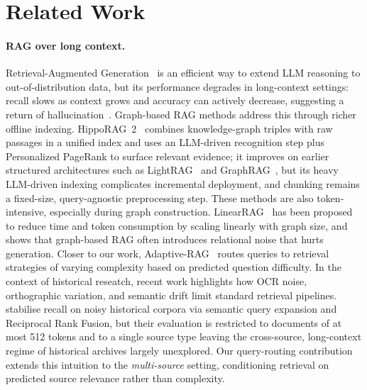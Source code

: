 
\section{Related Work}
\label{sec:related-work}

\paragraph{RAG over long context.}
Retrieval-Augmented Generation~\cite{rag_2020} is an efficient way to extend
LLM reasoning to out-of-distribution data, but its performance degrades in
long-context settings: recall slows as context grows and accuracy can
actively decrease, suggesting a return of hallucination~\cite{leng_long_2024}. Graph-based RAG methods address this through richer offline indexing.
HippoRAG~2~\cite{hipporagv2} combines knowledge-graph triples with raw passages in a unified index and uses an LLM-driven recognition step plus Personalized PageRank to surface
relevant evidence; it improves on earlier structured architectures such as
LightRAG~\cite{lightrag} and GraphRAG~\cite{graphrag_2024}, but its heavy
LLM-driven indexing complicates incremental deployment, and chunking remains
a fixed-size, query-agnostic preprocessing step. These methods are also token-intensive, especially during graph construction. LinearRAG~\cite{linearrag_2025} has been proposed to reduce time and token consumption by scaling linearly with graph size, and shows that graph-based RAG often introduces relational noise that hurts generation. Closer to our work, Adaptive-RAG~\cite{adaptive_rag_2024} routes
queries to retrieval strategies of varying complexity based on predicted
question difficulty.
In the context of historical reseatch, recent work highlights how OCR noise, orthographic
variation, and semantic drift limit standard retrieval pipelines.
\citet{Mudet_Bakkali_2025} stabilise recall on noisy historical corpora via
semantic query expansion and Reciprocal Rank Fusion, but their evaluation
is restricted to documents of at most 512 tokens and to a single source
type leaving the cross-source, long-context regime of historical
archives largely unexplored.
Our query-routing contribution extends this intuition to the
\emph{multi-source} setting, conditioning retrieval on predicted source
relevance rather than complexity.

